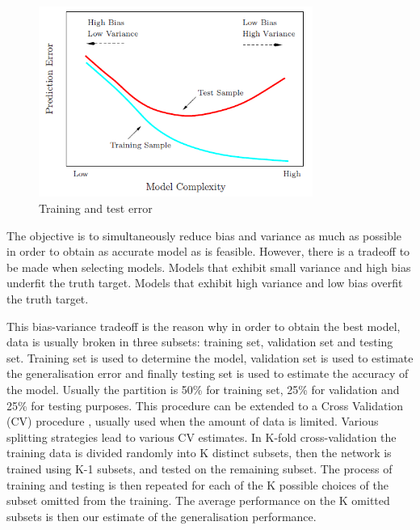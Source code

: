 \begin{figure}[!h]
  \centering
  \includegraphics[width=0.8\textwidth]{img/model_complexity}
  \caption{Training and test error}
  \label{fig:traintesterror}
\end{figure}


The objective is to simultaneously reduce bias and variance as much as possible in order to obtain as accurate model as is feasible.  However, there is a tradeoff to be made when selecting models. Models that exhibit small variance and high bias underfit the truth target.  Models that exhibit high variance and low bias overfit the truth target.

This bias-variance tradeoff is the reason why in order to obtain the best model, data is usually broken in three subsets: training set, validation set and testing set. Training set is used to determine the model, validation set is used to estimate the generalisation error and finally testing set is used to estimate the accuracy of the model. Usually the partition is 50\% for training set, 25\% for validation and 25\% for testing purposes. This procedure can be extended to a Cross Validation (CV) procedure \cite{geisser1975}, usually used when the amount of data is limited. Various splitting strategies lead to various CV estimates. In K-fold cross-validation the training data is divided randomly into K distinct subsets, then the network is trained using K-1 subsets, and tested on the remaining subset. The process of training and testing is then repeated for each of the K possible choices of the subset omitted from the training. The average performance on the K omitted subsets is then our estimate of the generalisation performance.

